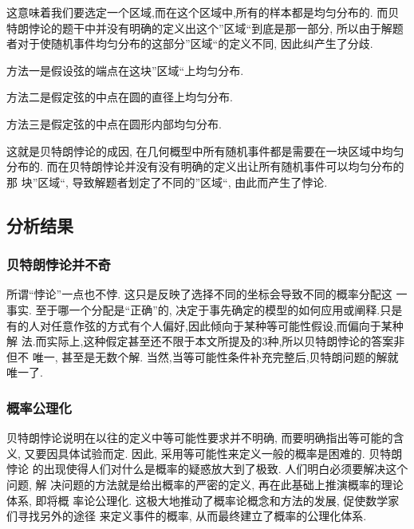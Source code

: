 这意味着我们要选定一个区域,而在这个区域中,所有的样本都是均匀分布的. 而贝特朗悖论的题干中并没有明确的定义出这个”区域“到底是那一部分, 所以由于解题者对于使随机事件均匀分布的这部分”区域“的定义不同, 因此纠产生了分歧.

\par 方法一是假设弦的端点在这块”区域“上均匀分布.

\par 方法二是假定弦的中点在圆的直径上均匀分布.

\par 方法三是假定弦的中点在圆形内部均匀分布.

\par 这就是贝特朗悖论的成因, 在几何概型中所有随机事件都是需要在一块区域中均匀
分布的. 而在贝特朗悖论并没有没有明确的定义出让所有随机事件可以均匀分布的那
块”区域“, 导致解题者划定了不同的”区域“, 由此而产生了悖论.

\subsection{分析结果}

\subsubsection{贝特朗悖论并不奇}

所谓“悖论”一点也不悖. 这只是反映了选择不同的坐标会导致不同的概率分配这
一事实. 至于哪一个分配是“正确”的, 决定于事先确定的模型的如何应用或阐释.只是
有的人对任意作弦的方式有个人偏好,因此倾向于某种等可能性假设,而偏向于某种解
法.而实际上,这种假定甚至还不限于本文所提及的3种,所以贝特朗悖论的答案非但不
唯一, 甚至是无数个解. 当然,当等可能性条件补充完整后,贝特朗问题的解就唯一了.

\subsubsection{概率公理化}

贝特朗悖论说明在以往的定义中等可能性要求并不明确, 而要明确指出等可能的含
义, 又要因具体试验而定. 因此, 采用等可能性来定义一般的概率是困难的. 贝特朗悖论
的出现使得人们对什么是概率的疑惑放大到了极致. 人们明白必须要解决这个问题, 解
决问题的方法就是给出概率的严密的定义, 再在此基础上推演概率的理论体系, 即将概
率论公理化. 这极大地推动了概率论概念和方法的发展, 促使数学家们寻找另外的途径
来定义事件的概率, 从而最终建立了概率的公理化体系.